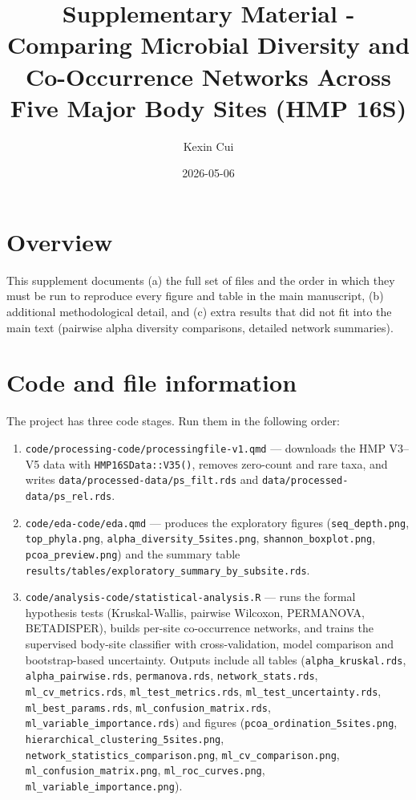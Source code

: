\documentclass[
  letterpaper,
  DIV=11,
  numbers=noendperiod]{scrartcl}
\title{Supplementary Material - Comparing Microbial Diversity and
Co-Occurrence Networks Across Five Major Body Sites (HMP 16S)}
\author{Kexin Cui}
\date{2026-05-06}
\providecommand{\tightlist}{%
  \setlength{\itemsep}{0pt}\setlength{\parskip}{0pt}}
\begin{document}
\maketitle


\section{Overview}\label{overview}

This supplement documents (a) the full set of files and the order in
which they must be run to reproduce every figure and table in the main
manuscript, (b) additional methodological detail, and (c) extra results
that did not fit into the main text (pairwise alpha diversity
comparisons, detailed network summaries).

\section{Code and file information}\label{code-and-file-information}

The project has three code stages. Run them in the following order:

\begin{enumerate}
\def\labelenumi{\arabic{enumi}.}
\tightlist
\item
  \texttt{code/processing-code/processingfile-v1.qmd} --- downloads the
  HMP V3--V5 data with \texttt{HMP16SData::V35()}, removes zero-count
  and rare taxa, and writes \texttt{data/processed-data/ps\_filt.rds}
  and \texttt{data/processed-data/ps\_rel.rds}.
\item
  \texttt{code/eda-code/eda.qmd} --- produces the exploratory figures
  (\texttt{seq\_depth.png}, \texttt{top\_phyla.png},
  \texttt{alpha\_diversity\_5sites.png}, \texttt{shannon\_boxplot.png},
  \texttt{pcoa\_preview.png}) and the summary table
  \texttt{results/tables/exploratory\_summary\_by\_subsite.rds}.
\item
  \texttt{code/analysis-code/statistical-analysis.R} --- runs the formal
  hypothesis tests (Kruskal-Wallis, pairwise Wilcoxon, PERMANOVA,
  BETADISPER), builds per-site co-occurrence networks, and trains the
  supervised body-site classifier with cross-validation, model
  comparison and bootstrap-based uncertainty. Outputs include all tables
  (\texttt{alpha\_kruskal.rds}, \texttt{alpha\_pairwise.rds},
  \texttt{permanova.rds}, \texttt{network\_stats.rds},
  \texttt{ml\_cv\_metrics.rds}, \texttt{ml\_test\_metrics.rds},
  \texttt{ml\_test\_uncertainty.rds}, \texttt{ml\_best\_params.rds},
  \texttt{ml\_confusion\_matrix.rds},
  \texttt{ml\_variable\_importance.rds}) and figures
  (\texttt{pcoa\_ordination\_5sites.png},
  \texttt{hierarchical\_clustering\_5sites.png},
  \texttt{network\_statistics\_comparison.png},
  \texttt{ml\_cv\_comparison.png}, \texttt{ml\_confusion\_matrix.png},
  \texttt{ml\_roc\_curves.png}, \texttt{ml\_variable\_importance.png}).
\end{enumerate}
\end{document}
